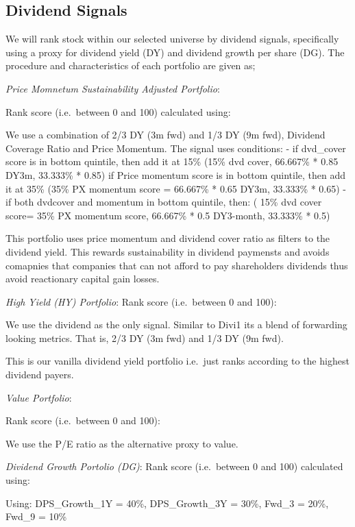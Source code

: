 \documentclass[12pt,preprint, authoryear]{elsarticle}
\numberwithin{equation}{section}
\numberwithin{figure}{section}
\numberwithin{table}{section}
\begin{document}
\newpage

\hypertarget{dividend-signals}{%
\subsection{Dividend Signals}\label{dividend-signals}}

We will rank stock within our selected universe by dividend signals,
specifically using a proxy for dividend yield (DY) and dividend growth
per share (DG). The procedure and characteristics of each portfolio are
given as;

\emph{Price Momnetum Sustainability Adjusted Portfolio}:

Rank score (i.e.~between 0 and 100) calculated using:

We use a combination of 2/3 DY (3m fwd) and 1/3 DY (9m fwd), Dividend
Coverage Ratio and Price Momentum. The signal uses conditions: - if
dvd\_cover score is in bottom quintile, then add it at 15\% (15\% dvd
cover, 66.667\% * 0.85 DY3m, 33.333\% * 0.85) if Price momentum score is
in bottom quintile, then add it at 35\% (35\% PX momentum score =
66.667\% * 0.65 DY3m, 33.333\% * 0.65) - if both dvdcover and momentum
in bottom quintile, then: ( 15\% dvd cover score= 35\% PX momentum
score, 66.667\% * 0.5 DY3-month, 33.333\% * 0.5)

This portfolio uses price momentum and dividend cover ratio as filters
to the dividend yield. This rewards sustainability in dividend paymensts
and avoids comapnies that companies that can not afford to pay
shareholders dividends thus avoid reactionary capital gain losses.

\emph{High Yield (HY) Portfolio}: Rank score (i.e.~between 0 and 100):

We use the dividend as the only signal. Similar to Divi1 its a blend of
forwarding looking metrics. That is, 2/3 DY (3m fwd) and 1/3 DY (9m
fwd).

This is our vanilla dividend yield portfolio i.e.~just ranks according
to the highest dividend payers.

\emph{Value Portfolio}:

Rank score (i.e.~between 0 and 100):

We use the P/E ratio as the alternative proxy to value.

\emph{Dividend Growth Portolio (DG)}: Rank score (i.e.~between 0 and
100) calculated using:

Using: DPS\_Growth\_1Y = 40\%, DPS\_Growth\_3Y = 30\%, Fwd\_3 = 20\%,
Fwd\_9 = 10\%
\end{document}
